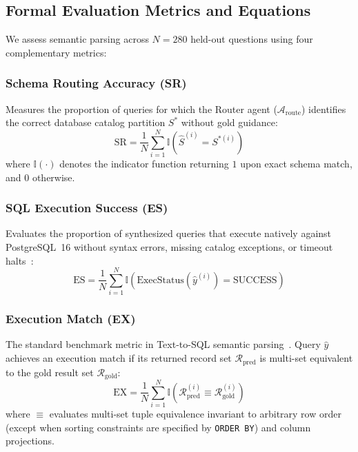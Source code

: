 \documentclass[conference]{IEEEtran}
\begin{document}
\subsection{Formal Evaluation Metrics and Equations}
We assess semantic parsing across $N = 280$ held-out questions using four complementary metrics:

\subsubsection{Schema Routing Accuracy (SR)}
Measures the proportion of queries for which the Router agent ($\mathcal{A}_{\text{route}}$) identifies the correct database catalog partition $S^*$ without gold guidance:
\begin{equation}
    \text{SR} = \frac{1}{N} \sum_{i=1}^N \mathbb{I}\left( \hat{S}^{(i)} = S^{*(i)} \right)
\end{equation}
where $\mathbb{I}(\cdot)$ denotes the indicator function returning $1$ upon exact schema match, and $0$ otherwise.

\subsubsection{SQL Execution Success (ES)}
Evaluates the proportion of synthesized queries that execute natively against PostgreSQL~16 without syntax errors, missing catalog exceptions, or timeout halts~\cite{dawar2026indicdbbench}:
\begin{equation}
    \text{ES} = \frac{1}{N} \sum_{i=1}^N \mathbb{I}\left( \text{ExecStatus}(\hat{y}^{(i)}) = \text{SUCCESS} \right)
\end{equation}

\subsubsection{Execution Match (EX)}
The standard benchmark metric in Text-to-SQL semantic parsing~\cite{yu2018spider,li2023bird}. Query $\hat{y}$ achieves an execution match if its returned record set $\mathcal{R}_{\text{pred}}$ is multi-set equivalent to the gold result set $\mathcal{R}_{\text{gold}}$:
\begin{equation}
    \text{EX} = \frac{1}{N} \sum_{i=1}^N \mathbb{I}\left( \mathcal{R}_{\text{pred}}^{(i)} \equiv \mathcal{R}_{\text{gold}}^{(i)} \right)
\end{equation}
where $\equiv$ evaluates multi-set tuple equivalence invariant to arbitrary row order (except when sorting constraints are specified by \texttt{ORDER BY}) and column projections.
\end{document}
